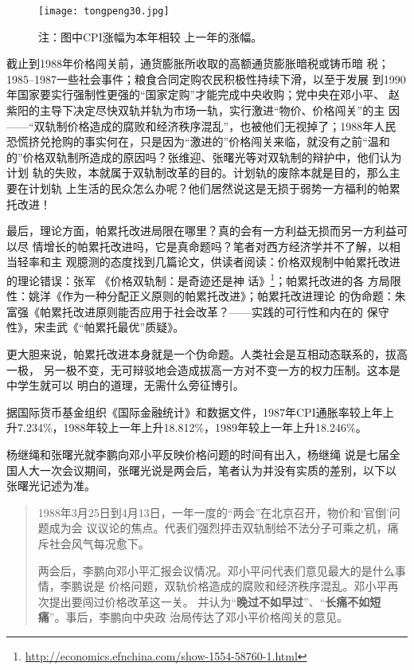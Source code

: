 \begin{figure}[ht]
  \centering
  \texttt{[image: tongpeng30.jpg]}
  \caption[1980--2012年CPI通膨率]{\label{fig:tongpeng30}注：图中CPI涨幅为本年相较
    上一年的涨幅。 }
\end{figure}

截止到1988年价格闯关前，通货膨胀所收取的高额通货膨胀暗税或铸币暗
税；1985--1987一些社会事件；粮食合同定购农民积极性持续下滑，以至于发展
到1990年国家要实行强制性更强的“国家定购”才能完成中央收购；党中央在邓小平、
赵紫阳的主导下决定尽快双轨并轨为市场一轨，实行激进“物价、价格闯关”的主
因——“双轨制价格造成的腐败和经济秩序混乱”，也被他们无视掉了；1988年人民
恐慌挤兑抢购的事实何在，只是因为“激进的”价格闯关来临，就没有之前“温和
的”价格双轨制所造成的原因吗？张维迎、张曙光等对双轨制的辩护中，他们认为计划
轨的失败，本就属于双轨制改革的目的。计划轨的废除本就是目的，那么主要在计划轨
上生活的民众怎么办呢？他们居然说这是无损于弱势一方福利的帕累托改进！

最后，理论方面，帕累托改进局限在哪里？真的会有一方利益无损而另一方利益可以尽
情增长的帕累托改进吗，它是真命题吗？笔者对西方经济学并不了解，以相当轻率和主
观臆测的态度找到几篇论文，供读者阅读：价格双规制中帕累托改进的理论错误：张军
《价格双轨制：是奇迹还是神
话》\footnote{\url{http://economics.efnchina.com/show-1554-58760-1.html}}；帕累托改进的各
方局限性：姚洋《作为一种分配正义原则的帕累托改进》\cite{yaoyang}；帕累托改进理论
的伪命题：朱富强《帕累托改进原则能否应用于社会改革？——实践的可行性和内在的
保守性》\cite{zhufuqiang}，宋圭武《“帕累托最优”质疑》\cite{songguiwu}。

更大胆来说，帕累托改进本身就是一个伪命题。人类社会是互相动态联系的，拔高一极，
另一极不变，无可辩驳地会造成拔高一方对不变一方的权力压制。这本是中学生就可以
明白的道理，无需什么旁征博引。

据国际货币基金组织《国际金融统计》和数据文件，1987年CPI通胀率较上年上
升7.234\%，1988年较上一年上升18.812\%，1989年较上一年上升18.246\%。

杨继绳\cite{yangshuanggui}和张曙光就李鹏向邓小平反映价格问题的时间有出入，杨继绳
说是七届全国人大一次会议期间，张曙光说是两会后，笔者认为并没有实质的差别，以下以
张曙光记述为准。
\begin{quotation}
  1988年3月25日到4月13日，一年一度的“两会”在北京召开，物价和‘官倒’问题成为会
  议议论的焦点。代表们强烈抨击双轨制给不法分子可乘之机，痛斥社会风气每况愈下。

  两会后，李鹏向邓小平汇报会议情况。邓小平问代表们意见最大的是什么事情，李鹏说是
  价格问题，双轨价格造成的腐败和经济秩序混乱。邓小平再次提出要闯过价格改革这一关。
  并认为“\textbf{晚过不如早过}”、“\textbf{长痛不如短痛}”。事后，李鹏向中央政
  治局传达了邓小平价格闯关的意见。
\end{quotation}


